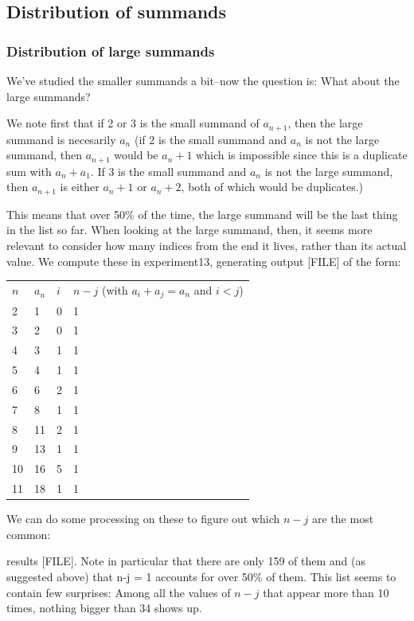 \documentclass{article}
\theoremstyle{definition}
\theoremstyle{remark}
\numberwithin{equation}{section}
\begin{document}
{\subsection{Distribution of summands}

\subsubsection{Distribution of large summands}
We've studied the smaller summands a bit--now the question is: What
about the large summands?

We note first that if 2 or 3 is the small summand of $a_{n+1}$, then
the large summand is necesarily $a_n$ (if 2 is the small summand and
$a_n$ is not the large summand, then $a_{n+1}$ would be $a_n + 1$
which is impossible since this is a duplicate sum with $a_n+a_1$.  If
3 is the small summand and $a_n$ is not the large summand, then
$a_{n+1}$ is either $a_n + 1$ or $a_n + 2$, both of which would be
duplicates.)

This means that over 50\% of the time, the large summand will be the
last thing in the list so far.  When looking at the large summand,
then, it seems more relevant to consider how many indices from the end
it lives, rather than its actual value.  We compute these in
experiment13, generating output [FILE] of the form:

\begin{tabular}{|l|l|l|l|}
$n$ 	&$a_n$	&$i$	&$n-j$ (with $a_i + a_j = a_n$ and $i < j$)\\
2 	&1 	&0 	&1\\
3 	&2 	&0 	&1\\
4 	&3 	&1 	&1\\
5 	&4 	&1 	&1\\
6 	&6 	&2 	&1\\
7 	&8 	&1 	&1\\
8 	&11 	&2 	&1\\
9 	&13 	&1 	&1\\
10 	&16 	&5 	&1\\
11 	&18 	&1 	&1
\end{tabular}

We can do some processing on these to figure out which $n-j$ are the
most common:


results [FILE].  Note in particular that there are only 159 of them
and (as suggested above) that n-j = 1 accounts for over 50\% of them.
This list seems to contain few surprises: Among all the values of $n-j$
that appear more than 10 times, nothing bigger than 34 shows up.

}
\end{document}
